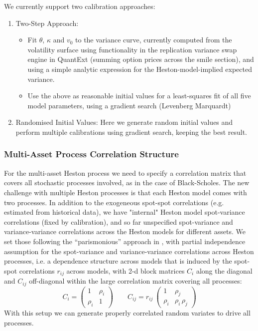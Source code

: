 We currently support two calibration approaches:

\begin{enumerate}
\item Two-Step Approach:
  \begin{itemize}
  \item Fit $\theta$, $\kappa$ and $v_0$ to the variance curve, currently computed from the volatility surface
    using functionality in the replication variance swap engine in Quant\-Ext (summing option prices across the
    smile section), and using a simple analytic expression for the Heston-model-implied expected variance.
  \item Use the above as reasonable initial values for a least-squares fit of all five model pa\-ra\-me\-ters,
    using a gradient search (Levenberg Marquardt)
  \end{itemize}
\item Randomised Initial Values: Here we generate random initial values and perform multiple calibrations
  using gradient search, keeping the best result. 
\end{enumerate}

\subsubsection*{Multi-Asset Process Correlation Structure}

For the multi-asset Heston process we need to specify a correlation matrix that covers all stochastic processes
involved, as in the case of Black-Scholes. The new challenge with multiple Heston processes is that each Heston
model comes with two processes. In addition to the exogeneous spot-spot correlations (e.g. estimated from
historical data), we have "internal" Heston model spot-variance correlations (fixed by calibration), and so far
unspecified spot-variance and variance-variance correlations across the Heston models for different assets.
We set those following the ``parismonious'' approach in \cite{dimitroff_2011},
with partial independence assumption for the spot-variance and variance-variance correlations across Heston
processes, i.e. a dependence structure across models that is induced by the spot-spot correlations $r_{ij}$
across models, with 2-d block matrices $C_i$ along the diagonal and $C_{ij}$ off-diagonal within the large
correlation matrix covering all processes:
$$       
C_i =\left(\begin{array}{cc} 1 & \rho_i \\ \rho_i & 1 \end{array} \right)
       \qquad
C_{ij} = r_{ij}\:\left(\begin{array}{cc} 1 & \rho_j \\ \rho_i & \rho_i \,\rho_j \end{array}\right)
$$
With this setup we can generate properly correlated random variates to drive all processes.

